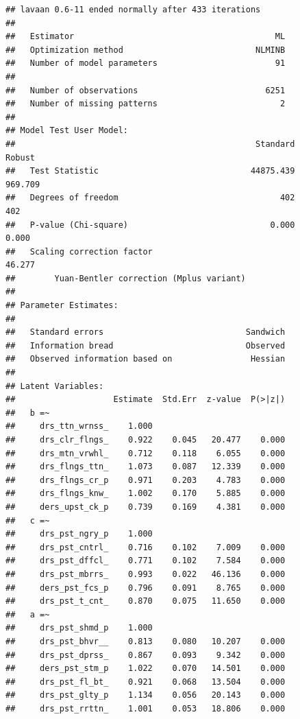 \documentclass[
]{book}
\begin{document}
\begin{verbatim}
## lavaan 0.6-11 ended normally after 433 iterations
## 
##   Estimator                                         ML
##   Optimization method                           NLMINB
##   Number of model parameters                        91
##                                                       
##   Number of observations                          6251
##   Number of missing patterns                         2
##                                                       
## Model Test User Model:
##                                                 Standard      Robust
##   Test Statistic                               44875.439     969.709
##   Degrees of freedom                                 402         402
##   P-value (Chi-square)                             0.000       0.000
##   Scaling correction factor                                   46.277
##        Yuan-Bentler correction (Mplus variant)                      
## 
## Parameter Estimates:
## 
##   Standard errors                             Sandwich
##   Information bread                           Observed
##   Observed information based on                Hessian
## 
## Latent Variables:
##                    Estimate  Std.Err  z-value  P(>|z|)
##   b =~                                                
##     drs_ttn_wrnss_    1.000                           
##     drs_clr_flngs_    0.922    0.045   20.477    0.000
##     drs_mtn_vrwhl_    0.712    0.118    6.055    0.000
##     drs_flngs_ttn_    1.073    0.087   12.339    0.000
##     drs_flngs_cr_p    0.971    0.203    4.783    0.000
##     drs_flngs_knw_    1.002    0.170    5.885    0.000
##     ders_upst_ck_p    0.739    0.169    4.381    0.000
##   c =~                                                
##     drs_pst_ngry_p    1.000                           
##     drs_pst_cntrl_    0.716    0.102    7.009    0.000
##     drs_pst_dffcl_    0.771    0.102    7.584    0.000
##     drs_pst_mbrrs_    0.993    0.022   46.136    0.000
##     ders_pst_fcs_p    0.796    0.091    8.765    0.000
##     drs_pst_t_cnt_    0.870    0.075   11.650    0.000
##   a =~                                                
##     drs_pst_shmd_p    1.000                           
##     drs_pst_bhvr__    0.813    0.080   10.207    0.000
##     drs_pst_dprss_    0.867    0.093    9.342    0.000
##     ders_pst_stm_p    1.022    0.070   14.501    0.000
##     drs_pst_fl_bt_    0.921    0.068   13.504    0.000
##     drs_pst_glty_p    1.134    0.056   20.143    0.000
##     drs_pst_rrttn_    1.001    0.053   18.806    0.000

\end{verbatim}
\end{document}

